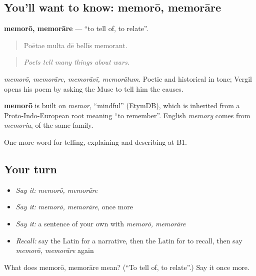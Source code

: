 \subsection*{You'll want to know: memorō, memorāre}
\textbf{memorō, memorāre} — \textquotedblleft{}to tell of, to relate\textquotedblright{}.

\begin{quote}
Poētae multa dē bellīs memorant.
\end{quote}

\begin{quote}
\emph{Poets tell many things about wars.}
\end{quote}

\emph{memorō, memorāre, memorāvī, memorātum}. Poetic and historical in tone; Vergil opens his poem by asking the Muse to tell him the causes.

\begin{cousinweb}
\textbf{memorō} is built on \emph{memor}, \textquotedblleft{}mindful\textquotedblright{} (EtymDB), which is inherited from a Proto-Indo-European root meaning \textquotedblleft{}to remember\textquotedblright{}. English \emph{memory} comes from \emph{memoria}, of the same family.
\end{cousinweb}

\begin{grammarlens}[title={What you've built}]
One more word for telling, explaining and describing at B1.
\end{grammarlens}

\subsection*{Your turn}
\begin{itemize}
\raggedright
  \item \emph{Say it:} \emph{memorō, memorāre}
  \item \emph{Say it:} \emph{memorō, memorāre}, once more
  \item \emph{Say it:} a sentence of your own with \emph{memorō, memorāre}
  \item \emph{Recall:} say the Latin for a narrative, then the Latin for to recall, then say \emph{memorō, memorāre} again
\end{itemize}

\begin{tcolorbox}[breakable,colback=teal!4,colframe=teal!35!black,title={Before you move on}]
What does memorō, memorāre mean? (\textquotedblleft{}To tell of, to relate\textquotedblright{}.) Say it once more.
\end{tcolorbox}
